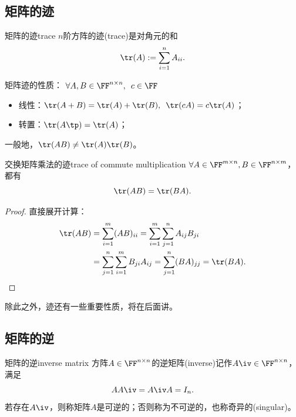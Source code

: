 \subsection{矩阵的迹}

\begin{definition}{矩阵的迹}{trace}
	$n$阶方阵的迹(trace)是对角元的和
	\begin{equation}
		\tr(A):=\sum_{i=1}^nA_{ii}.
	\end{equation}
\end{definition}
\begin{corollary}
	矩阵迹的性质：%
	$\forall A,B\in\FF^{n\times n},\enspace c\in\FF$
    \begin{itemize}
    	\item 线性：$\tr(A+B)=\tr(A)+\tr(B),\enspace \tr(cA)=c\tr(A)$；
    	\item 转置：$\tr(A\tp)=\tr(A)$；
    \end{itemize}
\end{corollary}
\begin{remark}
	一般地，$\tr(AB)\neq\tr(A)\tr(B)$。
\end{remark}
\begin{theorem}{交换矩阵乘法的迹}{trace of commute multiplication}
	$\forall A\in\FF^{m\times n},B\in\FF^{n\times m}$，都有
	\begin{equation}
		\tr(AB)=\tr(BA).
	\end{equation}
\end{theorem}
\begin{proof}
	直接展开计算：
	\begin{align*}
		\tr(AB)&=\sum_{i=1}^m(AB)_{ii}=\sum_{i=1}^m\sum_{j=1}^nA_{ij}B_{ji}\\
		&=\sum_{j=1}^n\sum_{i=1}^mB_{ji}A_{ij}=\sum_{j=1}^n(BA)_{jj}=\tr(BA).
		\qedhere
	\end{align*}
\end{proof}

\begin{remark}
	除此之外，迹还有一些重要性质，将在后面讲。
\end{remark}

\subsection{矩阵的逆}

\begin{definition}{矩阵的逆}{inverse matrix}
	方阵$A\in\FF^{n\times n}$的逆矩阵(inverse)记作$A\iv\in\FF^{n\times n}$，满足
	\[
		AA\iv=A\iv A=I_n.
	\]
	若存在$A\iv$，则称矩阵$A$是可逆的；否则称为不可逆的，也称奇异的(singular)。
\end{definition}


